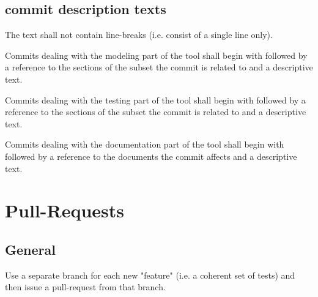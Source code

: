 \documentclass[draft]{efsguide}
\begin{document}
\subsection{commit description texts}
\label{rules:committexts}
\begin{rules}
\item The text shall not contain line-breaks (i.e. consist of a single line only). 
\item Commits dealing with the modeling part of the tool shall begin with  followed by a reference to the sections of the subset the commit is related to and a descriptive text. 
\item Commits dealing with the testing part of the tool shall begin with  followed by a reference to the sections of the subset the commit is related to and a descriptive text. 
\item Commits dealing with the documentation part of the tool shall begin with  followed by a reference to the documents the commit affects and a descriptive text. 
\end{rules}


\section{Pull-Requests}
\label{sec:pull_request}
\subsection{General}
\begin{rules}

\item Use a separate branch for each new "feature" (i.e. a coherent set of tests) and then issue a pull-request from that branch. 

\end{rules}
\end{document}
